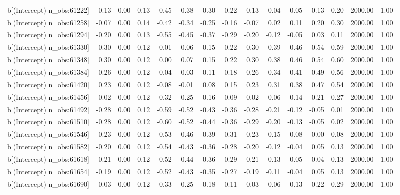 \begin{table}[ht]
\begin{tabular}{rrrrrrrrrrrrrrr}
  b[(Intercept) n\_obs:61222] & -0.13 & 0.00 & 0.13 & -0.45 & -0.38 & -0.30 & -0.22 & -0.13 & -0.04 & 0.05 & 0.13 & 0.20 & 2000.00 & 1.00 \\ 
  b[(Intercept) n\_obs:61258] & -0.07 & 0.00 & 0.14 & -0.42 & -0.34 & -0.25 & -0.16 & -0.07 & 0.02 & 0.11 & 0.20 & 0.30 & 2000.00 & 1.00 \\ 
  b[(Intercept) n\_obs:61294] & -0.20 & 0.00 & 0.13 & -0.55 & -0.45 & -0.37 & -0.29 & -0.20 & -0.12 & -0.05 & 0.03 & 0.11 & 2000.00 & 1.00 \\ 
  b[(Intercept) n\_obs:61330] & 0.30 & 0.00 & 0.12 & -0.01 & 0.06 & 0.15 & 0.22 & 0.30 & 0.39 & 0.46 & 0.54 & 0.59 & 2000.00 & 1.00 \\ 
  b[(Intercept) n\_obs:61348] & 0.30 & 0.00 & 0.12 & 0.00 & 0.07 & 0.15 & 0.22 & 0.30 & 0.38 & 0.46 & 0.54 & 0.60 & 2000.00 & 1.00 \\ 
  b[(Intercept) n\_obs:61384] & 0.26 & 0.00 & 0.12 & -0.04 & 0.03 & 0.11 & 0.18 & 0.26 & 0.34 & 0.41 & 0.49 & 0.56 & 2000.00 & 1.00 \\ 
  b[(Intercept) n\_obs:61420] & 0.23 & 0.00 & 0.12 & -0.08 & -0.01 & 0.08 & 0.15 & 0.23 & 0.31 & 0.38 & 0.47 & 0.54 & 2000.00 & 1.00 \\ 
  b[(Intercept) n\_obs:61456] & -0.02 & 0.00 & 0.12 & -0.32 & -0.25 & -0.16 & -0.09 & -0.02 & 0.06 & 0.14 & 0.21 & 0.27 & 2000.00 & 1.00 \\ 
  b[(Intercept) n\_obs:61492] & -0.28 & 0.00 & 0.12 & -0.59 & -0.52 & -0.43 & -0.36 & -0.28 & -0.21 & -0.12 & -0.05 & 0.01 & 2000.00 & 1.00 \\ 
  b[(Intercept) n\_obs:61510] & -0.28 & 0.00 & 0.12 & -0.60 & -0.52 & -0.44 & -0.36 & -0.29 & -0.20 & -0.13 & -0.05 & 0.02 & 2000.00 & 1.00 \\ 
  b[(Intercept) n\_obs:61546] & -0.23 & 0.00 & 0.12 & -0.53 & -0.46 & -0.39 & -0.31 & -0.23 & -0.15 & -0.08 & 0.00 & 0.08 & 2000.00 & 1.00 \\ 
  b[(Intercept) n\_obs:61582] & -0.20 & 0.00 & 0.12 & -0.54 & -0.43 & -0.36 & -0.28 & -0.20 & -0.12 & -0.04 & 0.05 & 0.13 & 2000.00 & 1.00 \\ 
  b[(Intercept) n\_obs:61618] & -0.21 & 0.00 & 0.12 & -0.52 & -0.44 & -0.36 & -0.29 & -0.21 & -0.13 & -0.05 & 0.04 & 0.13 & 2000.00 & 1.00 \\ 
  b[(Intercept) n\_obs:61654] & -0.19 & 0.00 & 0.12 & -0.52 & -0.43 & -0.35 & -0.27 & -0.19 & -0.11 & -0.04 & 0.05 & 0.13 & 2000.00 & 1.00 \\ 
  b[(Intercept) n\_obs:61690] & -0.03 & 0.00 & 0.12 & -0.33 & -0.25 & -0.18 & -0.11 & -0.03 & 0.06 & 0.13 & 0.22 & 0.29 & 2000.00 & 1.00 \\ 

\end{tabular}
\end{table}
